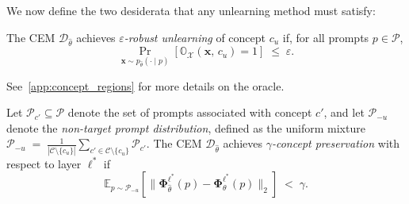 We now define the two desiderata that any unlearning method must satisfy:

\begin{definition}
\label{def:robust}
The CEM $\mathcal{D}_{\hat\theta}$ achieves \emph{$\varepsilon$-robust unlearning} of concept $c_u$ if, for all prompts $p \in \mathcal{P}$,%
\begin{equation}
    \Pr_{\mathbf{x} \sim p_{\hat\theta}(\cdot \mid p)}
\!\left[
\mathbb{O}_{\mathcal{X}}(\mathbf{x} ,\, c_u) = 1
\right]
\;\leq\; \varepsilon.
\end{equation}
\end{definition}
\noindent See~\cref{app:concept_regions} for more details on the oracle.

\begin{definition}
\label{def:neighbor}
Let $\mathcal{P}_{c'} \subseteq \mathcal{P}$ denote the set of prompts associated with concept $c'$, and let $\mathcal{P}_{-u}$ denote the \emph{non-target prompt distribution}, defined as the uniform mixture
$\mathcal{P}_{-u} \;=\; \tfrac{1}{|\mathcal{C}\setminus\{c_u\}|}\sum_{c' \in \mathcal{C}\setminus\{c_u\}} \mathcal{P}_{c'}$.
The CEM $\mathcal{D}_{\hat\theta}$ achieves \emph{$\gamma$-concept preservation} with respect to layer ${\ell^*}$ if
\begin{equation}
    \mathbb{E}_{p \sim \mathcal{P}_{-u}}\!\left[\bigl\|\boldsymbol{\Phi}^{\ell^*}_{\hat\theta}(p) - \boldsymbol{\Phi}^{\ell^*}_\theta(p)\bigr\|_2\right]
    \;<\; \gamma.
\end{equation}
\end{definition}




